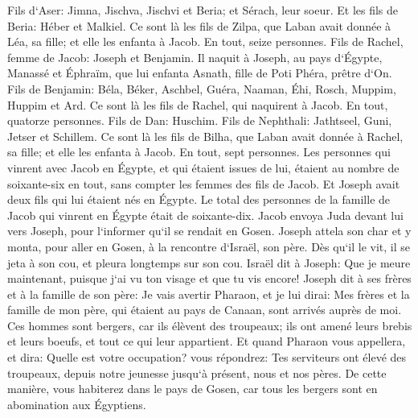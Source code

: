 \verse Fils d`Aser: Jimna, Jischva, Jischvi et Beria; et Sérach, leur soeur. Et les fils de Beria: Héber et Malkiel. 
\verse Ce sont là les fils de Zilpa, que Laban avait donnée à Léa, sa fille; et elle les enfanta à Jacob. En tout, seize personnes. 
\verse Fils de Rachel, femme de Jacob: Joseph et Benjamin. 
\verse Il naquit à Joseph, au pays d`Égypte, Manassé et Éphraïm, que lui enfanta Asnath, fille de Poti Phéra, prêtre d`On. 
\verse Fils de Benjamin: Béla, Béker, Aschbel, Guéra, Naaman, Éhi, Rosch, Muppim, Huppim et Ard. 
\verse Ce sont là les fils de Rachel, qui naquirent à Jacob. En tout, quatorze personnes. 
\verse Fils de Dan: Huschim. 
\verse Fils de Nephthali: Jathtseel, Guni, Jetser et Schillem. 
\verse Ce sont là les fils de Bilha, que Laban avait donnée à Rachel, sa fille; et elle les enfanta à Jacob. En tout, sept personnes. 
\verse Les personnes qui vinrent avec Jacob en Égypte, et qui étaient issues de lui, étaient au nombre de soixante-six en tout, sans compter les femmes des fils de Jacob. 
\verse Et Joseph avait deux fils qui lui étaient nés en Égypte. Le total des personnes de la famille de Jacob qui vinrent en Égypte était de soixante-dix. 
\verse Jacob envoya Juda devant lui vers Joseph, pour l`informer qu`il se rendait en Gosen. 
\verse Joseph attela son char et y monta, pour aller en Gosen, à la rencontre d`Israël, son père. Dès qu`il le vit, il se jeta à son cou, et pleura longtemps sur son cou. 
\verse Israël dit à Joseph: Que je meure maintenant, puisque j`ai vu ton visage et que tu vis encore! 
\verse Joseph dit à ses frères et à la famille de son père: Je vais avertir Pharaon, et je lui dirai: Mes frères et la famille de mon père, qui étaient au pays de Canaan, sont arrivés auprès de moi. 
\verse Ces hommes sont bergers, car ils élèvent des troupeaux; ils ont amené leurs brebis et leurs boeufs, et tout ce qui leur appartient. 
\verse Et quand Pharaon vous appellera, et dira: 
\verse Quelle est votre occupation? vous répondrez: Tes serviteurs ont élevé des troupeaux, depuis notre jeunesse jusqu`à présent, nous et nos pères. De cette manière, vous habiterez dans le pays de Gosen, car tous les bergers sont en abomination aux Égyptiens. 

